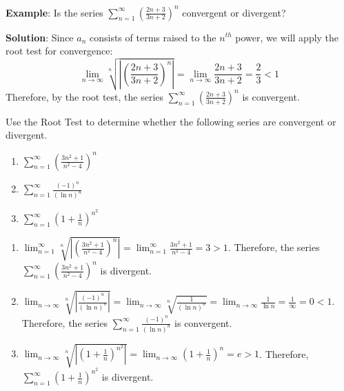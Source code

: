 \textbf{Example}: Is the series $\sum_{n=1}^\infty \left( \frac{2n + 3}{3n + 
2} \right)^n$ convergent or divergent?

\textbf{Solution}: Since $a_n$ consists of terms raised to the $n^{th}$ power, 
we will apply the root test for convergence:
$$\lim_{n \to \infty} \sqrt[n]{\left| \left( \frac{2n+3}{3n+2} \right)^n 
\right|} = \lim_{n \to \infty} \frac{2n+3}{3n+2} = \frac{2}{3} < 1$$ 
Therefore, by the root test, the series $\sum_{n=1}^\infty \left( \frac{2n + 
3}{3n + 2} \right)^n$ is convergent. 

\begin{Exercise}[label=root1]
Use the Root Test to determine whether the following series are convergent or 
divergent.
\begin{enumerate}
\item $\sum_{n=1}^\infty \left( \frac{3n^2 + 1}{n^2 - 4} \right)^n$
\item $\sum_{n=1}^\infty \frac{(-1)^{n}}{(\ln{n})^n}$
\item $\sum_{n=1}^\infty \left( 1+ \frac{1}{n} \right)^{n^2}$
\vspace{50mm}
\end{enumerate}
\end{Exercise}

\begin{Answer}
\begin{enumerate}
\item $\lim_{n=1}^\infty \sqrt[n]{\left| \left( \frac{3n^2 + 1}{n^2 - 4} \right)^n 
\right|} = \lim_{n=1}^\infty \frac{3n^2 + 1}{n^2 - 4} = 3 >1$. Therefore, 
the series $\sum_{n=1}^\infty \left( \frac{3n^2 + 1}{n^2 - 4} \right)^n$ is 
divergent.
\item $\lim_{n \to \infty} \sqrt[n]{\left| \frac{(-1)^{n}}{(\ln{n})^n} \right|} 
= \lim_{n \to \infty} \sqrt[n]{\frac{1}{(\ln{n})^n}} = \lim_{n \to \infty} 
\frac{1}{\ln{n}} = \frac{1}{\infty} = 0 < 1$. Therefore, the series $\sum_
{n=1}^\infty \frac{(-1)^{n}}{(\ln{n})^n}$ is convergent.
\item $\lim_{n \to \infty} \sqrt[n]{\left| \left( 1 + \frac{1}{n} \right)^{n^2} 
\right|} = \lim_{n \to \infty} \left(1 + \frac{1}{n} \right)^n = e > 1$. 
Therefore, $\sum_{n=1}^\infty \left( 1+ \frac{1}{n} \right)^{n^2}$ is divergent. 
\end{enumerate}
\end{Answer}

